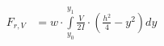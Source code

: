 \documentclass[preview,convert={density=300,outext=.png}]{standalone}
\begin{document}
\begin{align}
  F_{r,V} &= w\cdot \int\limits_{y_0}^{y_1} \frac{V}{2I}\cdot \left(\frac{h^2}{4} - y^2\right) dy
  \tag{5}
\end{align}
\end{document}
